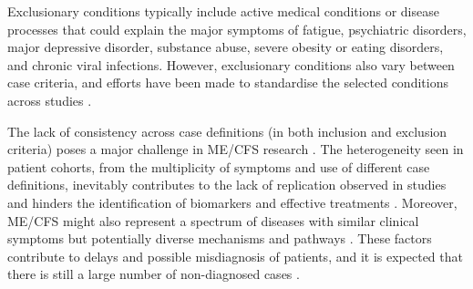 Exclusionary conditions typically include active medical conditions or disease processes that could explain the major symptoms of fatigue, psychiatric disorders, major depressive disorder, substance abuse, severe obesity or eating disorders, and chronic viral infections. However, exclusionary conditions also vary between case criteria, and efforts have been made to standardise the selected conditions across studies \citep{jason2023EstablishingConsensus}.

The lack of consistency across case definitions (in both inclusion and exclusion criteria) poses a major challenge in ME/CFS research \citep{jason2014ExaminingCase, nacul2017DifferingCase}. The heterogeneity seen in patient cohorts, from the multiplicity of symptoms and use of different case definitions, inevitably contributes to the lack of replication observed in studies and hinders the identification of biomarkers and effective treatments \citep{nacul2019HowHave, malato2021Statisticalchallenges, malato2023ImpactMisdiagnosis}. Moreover, ME/CFS might also represent a spectrum of diseases with similar clinical symptoms but potentially diverse mechanisms and pathways \citep{jason2005ChronicFatigue}. These factors contribute to delays and possible misdiagnosis of patients, and it is expected that there is still a large number of non-diagnosed cases \citep{solomon2004FactorsInfluencing, bayliss2014OvercomingBarriers}.


